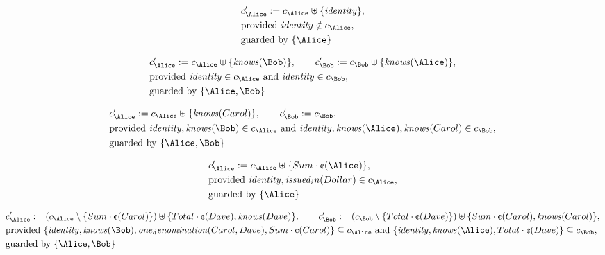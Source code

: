 \begin{align*}
&
c'_
{
\Alice
}
 := 
c_
{
\Alice
}
 \uplus 
\{
\mathit{
identity
}
\}
,\\
&
\text{provided } 
\mathit{
identity
}
 \notin c_
{
\Alice
}
,\\
&
\text{guarded by } \{
\Alice
\}
\end{align*}

\begin{align*}
&
c'_
{
\Alice
}
 := 
c_
{
\Alice
}
 \uplus 
\{
\mathit{
knows
}
(
\Bob
)
\}
, \qquad 
c'_
{
\Bob
}
 := 
c_
{
\Bob
}
 \uplus 
\{
\mathit{
knows
}
(
\Alice
)
\}
,\\
&
\text{provided } 
\mathit{
identity
}
 \in c_
{
\Alice
}
 \text{ and } 
\mathit{
identity
}
 \in c_
{
\Bob
}
,\\
&
\text{guarded by } \{
\Alice
,
\Bob
\}
\end{align*}

\begin{align*}
&
c'_
{
\Alice
}
 := 
c_
{
\Alice
}
 \uplus 
\{
\mathit{
knows
}
(
Carol
)
\}
, \qquad 
c'_
{
\Bob
}
 := 
c_
{
\Bob
}
,\\
&
\text{provided } 
\mathit{
identity
}
,
\mathit{
knows
}
(
\Bob
)
 \in c_
{
\Alice
}
 \text{ and } 
\mathit{
identity
}
,
\mathit{
knows
}
(
\Alice
)
,
\mathit{
knows
}
(
Carol
)
 \in c_
{
\Bob
}
,\\
&
\text{guarded by } \{
\Alice
,
\Bob
\}
\end{align*}

\begin{align*}
&
c'_
{
\Alice
}
 := 
c_
{
\Alice
}
 \uplus 
\{
Sum
\cdot
\text{\textcent}
(
\Alice
)
\}
,\\
&
\text{provided } 
\mathit{
identity
}
,
\mathit{
issued_in
}
(
Dollar
)
 \in c_
{
\Alice
}
,\\
&
\text{guarded by } \{
\Alice
\}
\end{align*}

\begin{align*}
&
c'_
{
\Alice
}
 := 
(c_
{
\Alice
}
 \setminus 
\{
Sum
\cdot
\text{\textcent}
(
Carol
)
\}
) \uplus 
\{
Total
\cdot
\text{\textcent}
(
Dave
)
,
\mathit{
knows
}
(
Dave
)
\}
, \qquad 
c'_
{
\Bob
}
 := 
(c_
{
\Bob
}
 \setminus 
\{
Total
\cdot
\text{\textcent}
(
Dave
)
\}
) \uplus 
\{
Sum
\cdot
\text{\textcent}
(
Carol
)
,
\mathit{
knows
}
(
Carol
)
\}
,\\
&
\text{provided } 
\{
\mathit{
identity
}
,
\mathit{
knows
}
(
\Bob
)
,
\mathit{
one_denomination
}
(
Carol
,
Dave
)
,
Sum
\cdot
\text{\textcent}
(
Carol
)
\}
 \subseteq c_
{
\Alice
}
 \text{ and } 
\{
\mathit{
identity
}
,
\mathit{
knows
}
(
\Alice
)
,
Total
\cdot
\text{\textcent}
(
Dave
)
\}
 \subseteq c_
{
\Bob
}
,\\
&
\text{guarded by } \{
\Alice
,
\Bob
\}
\end{align*}
